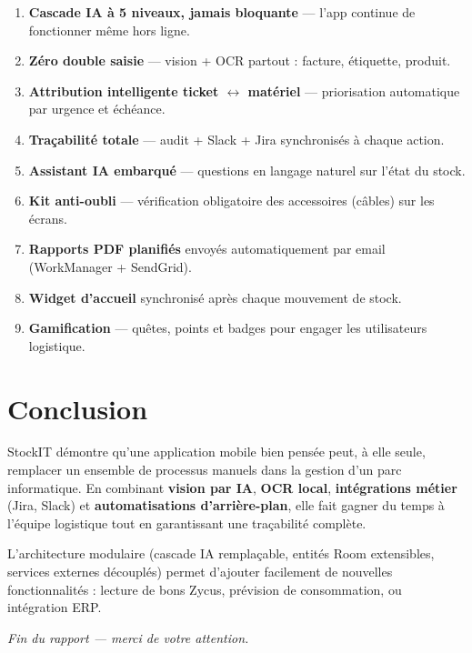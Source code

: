 \documentclass[11pt,a4paper]{article}
\begin{document}
\begin{ideabox}
\begin{enumerate}
  \item \textbf{Cascade IA à 5 niveaux, jamais bloquante} — l'app
        continue de fonctionner même hors ligne.
  \item \textbf{Zéro double saisie} — vision + OCR partout : facture,
        étiquette, produit.
  \item \textbf{Attribution intelligente ticket $\leftrightarrow$ matériel} —
        priorisation automatique par urgence et échéance.
  \item \textbf{Traçabilité totale} — audit + Slack + Jira synchronisés
        à chaque action.
  \item \textbf{Assistant IA embarqué} — questions en langage naturel
        sur l'état du stock.
  \item \textbf{Kit anti-oubli} — vérification obligatoire des
        accessoires (câbles) sur les écrans.
  \item \textbf{Rapports PDF planifiés} envoyés automatiquement par
        email (WorkManager + SendGrid).
  \item \textbf{Widget d'accueil} synchronisé après chaque mouvement
        de stock.
  \item \textbf{Gamification} — quêtes, points et badges pour
        engager les utilisateurs logistique.
\end{enumerate}
\end{ideabox}

\section{Conclusion}

StockIT démontre qu'une application mobile bien pensée peut, à elle
seule, remplacer un ensemble de processus manuels dans la gestion
d'un parc informatique. En combinant \textbf{vision par IA},
\textbf{OCR local}, \textbf{intégrations métier} (Jira, Slack) et
\textbf{automatisations d'arrière-plan}, elle fait gagner du temps à
l'équipe logistique tout en garantissant une traçabilité complète.

L'architecture modulaire (cascade IA remplaçable, entités Room
extensibles, services externes découplés) permet d'ajouter facilement
de nouvelles fonctionnalités : lecture de bons Zycus, prévision de
consommation, ou intégration ERP.

\vspace{6pt}
\begin{center}
\color{primary!70}\itshape\small
Fin du rapport — merci de votre attention.
\end{center}
\end{document}
